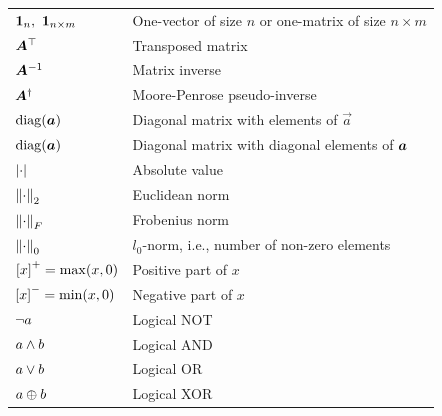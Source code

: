 {\begin{longtable}{p{5cm} p{10cm}}
$\onevec{n},\ \onemat{n}{m}$ & One-vector of size $n$ or one-matrix of size $n\times m$ \\
$\bm{A}^{\top}$ & Transposed matrix \\
$\bm{A}^{-1}$ & Matrix inverse\\
$\bm{A}^{\dagger}$ & Moore-Penrose pseudo-inverse\\
$\operatorname{diag}(\bm{a})$ & Diagonal matrix with elements of $\vec{a}$ \\
$\operatorname{diag}(\bm{a})$ & Diagonal matrix with diagonal elements of $\bm{a}$ \\
$\left\vert \cdot \right\vert$ & Absolute value \\
$\left\Vert \cdot \right\Vert_{2}$ & Euclidean norm \\
$\left\Vert \cdot \right\Vert_{F}$ & Frobenius norm \\
$\left\Vert \cdot \right\Vert_{0}$ & $l_0$-norm, i.e., number of non-zero elements \\
$\left[x\right]^{+} = \max(x,0)$ &  Positive part of $x$\\
$\left[x\right]^{-} = \min(x,0)$ &  Negative part of $x$\\
$\lnot a$ & Logical NOT \\
$a \wedge b$ & Logical AND \\
$a \vee b$ & Logical OR \\
$a \oplus b$ & Logical XOR \\
	\end{longtable}
}

\cleardoublepage


